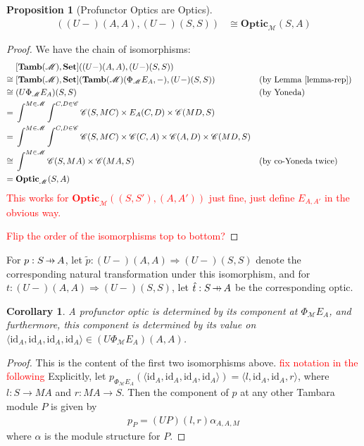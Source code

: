 \documentclass[11pt,a4paper]{article}
\theoremstyle{plain}
\newtheorem{proposition}[theorem]{Proposition}
\newtheorem{corollary}[theorem]{Corollary}
\theoremstyle{definition}
\newcommand{\C}{\mathscr{C}}
\newcommand{\M}{\mathscr{M}}
\newcommand{\Pastro}{\Phi}
\newcommand{\Set}{\mathbf{Set}}
\newcommand{\Optic}{\mathbf{Optic}}
\newcommand{\Tamb}{\mathbf{Tamb}}
\newcommand{\id}{\mathrm{id}}
\newcommand{\hto}{\ensuremath{\,\mathaccent\shortmid\rightarrow\,}}
\newcommand{\todo}[1]{\textcolor{red}{\small #1}}
\begin{document}
\begin{proposition}[Profunctor Optics are Optics]
\label{prop-profunctor-optics-are-optics}
\begin{align*}
[\Tamb(\M), \Set]((U-)(A,A),(U-)(S,S)) &\cong \Optic_\M(S, A)
\end{align*}
\end{proposition}
\begin{proof}
We have the chain of isomorphisms:
\begin{align*}
&[\Tamb(\M), \Set]((U-)(A,A),(U-)(S,S)) \\
\cong \;&[\Tamb(\M), \Set](\Tamb(\M)(\Pastro_\M E_A, -), (U-)(S,S))  && \text{(by Lemma \ref{lemma-rep})}\\
\cong \;&(U\Pastro_\M E_A)(S,S)  && \text{(by Yoneda)} \\
= \;&\int^{M \in \M} \int^{C,D \in \C} \C(S, MC) \times E_A(C,D) \times \C(MD,S) \\
= \;&\int^{M \in \M} \int^{C,D \in \C} \C(S, MC) \times \C(C,A) \times \C(A,D) \times \C(MD,S) \\
\cong \;&\int^{M \in \M} \C(S, MA) \times \C(MA, S)  && \text{(by co-Yoneda twice)} \\
= \;&\Optic_\M(S, A)
\end{align*}
\todo{This works for $\Optic_\M((S, S'), (A, A'))$ just fine, just define $E_{A,A'}$ in the obvious way.}

\todo{Flip the order of the isomorphisms top to bottom?}
\end{proof}

For $p : S \hto A$, let $\tilde{p} : (U-)(A,A) \Rightarrow (U-)(S,S)$ denote the corresponding natural transformation under this isomorphism, and for $t : (U-)(A,A) \Rightarrow (U-)(S,S)$, let $\hat{t} : S \hto A$ be the corresponding optic.

\begin{corollary}
A profunctor optic is determined by its component at $\Pastro_\M E_A$, and furthermore, this component is determined by its value on $\langle \id_A, \id_A, \id_A, \id_A \rangle \in (U \Pastro_\M E_A)(A, A)$.
\end{corollary}
\begin{proof}
This is the content of the first two isomorphisms above.
\todo{fix notation in the following}
Explicitly, let $p_{\Pastro_\M E_A}(\langle \id_A, \id_A, \id_A, \id_A \rangle) = \langle l, \id_A, \id_A, r \rangle$, where $l : S \to M A$ and $r : M A \to S$. Then the component of $p$ at any other Tambara module $P$ is given by
\begin{align*}
p_P = (UP)(l,r) \alpha_{A,A,M}
\end{align*}
where $\alpha$ is the module structure for $P$.
\end{proof}
\end{document}
